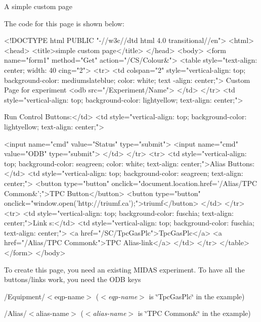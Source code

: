 \par
 \begin{center} A simple custom page  \end{center}  \par


The code for this page is shown below: 
\begin{DoxyCode}
 <!DOCTYPE html PUBLIC "-//w3c//dtd html 4.0 transitional//en">
<html>
<head>
<title>simple custom page</title>
</head>
<body>
<form name="form1" method="Get" action="/CS/Colour&">
<table style="text-align: center; width: 40%
      cing="2">
<tr>
<td colspan="2"
style="vertical-align: top; background-color: mediumslateblue; color: white; text
      -align: center;">
Custom Page for experiment <odb src="/Experiment/Name">
</td>
</tr>
<td
style="vertical-align: top; background-color: lightyellow;  text-align: center;">
      
Run Control Buttons:</td>
<td
style="vertical-align: top; background-color: lightyellow;  text-align: center;">
      
<input name="cmd" value="Status" type="submit">
<input name="cmd" value="ODB" type="submit">
</td>
</tr>
<tr>
<td
style="vertical-align: top; background-color: seagreen; color: white; text-align:
       center;">Alias Buttons:</td>
<td
style="vertical-align: top; background-color: seagreen;  text-align: center;">
<button type="button" onclick="document.location.href='/Alias/TPC Common&';">TPC 
      Button</button>
<button type="button" onclick="window.open('http://triumf.ca');">triumf</button>
</td>
</tr>
<tr>
<td
style="vertical-align: top; background-color: fuschia;  text-align: center;">Link
      s:</td>
<td
style="vertical-align: top; background-color: fuschia;  text-align: center;">
<a href="/SC/TpcGasPlc">TpcGasPlc</a>
<a href="/Alias/TPC Common&">TPC Alias-link</a>
</td>
</tr>
</table>
</form>
</body>
\end{DoxyCode}


To create this page, you need an existing MIDAS experiment. To have all the buttons/links work, you need the ODB keys
\begin{DoxyItemize}
\item /Equipment/$<$eqp-\/name$>$ ({\itshape $<$eqp-\/name$>$\/} is \char`\"{}TpcGasPlc\char`\"{} in the example)
\item /Alias/$<$alias-\/name$>$ ({\itshape $<$alias-\/name$>$\/} is \char`\"{}TPC Common\&\char`\"{} in the example)
\end{DoxyItemize}



